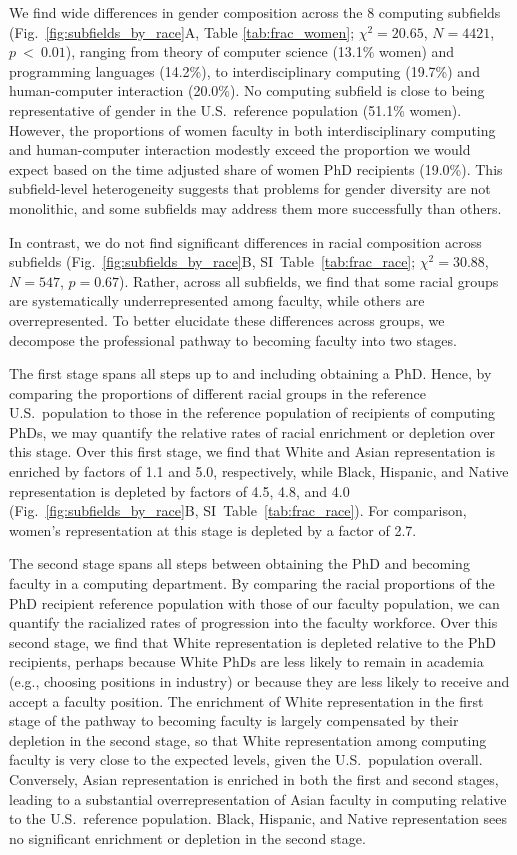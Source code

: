 \documentclass[reprint, twocolumn, aps, nofootinbib, superscriptaddress, longbibliography]{revtex4-1}
\begin{document}
We find wide differences in gender composition across the 8 computing subfields (Fig.~\ref{fig:subfields_by_race}A, Table \ref{tab:frac_women}; $\chi^{2} = 20.65$, $N = 4421$, $p~<~0.01$), ranging from theory of computer science (13.1\% women) and programming languages (14.2\%), to interdisciplinary computing (19.7\%) and human-computer interaction (20.0\%). No computing subfield is close to being representative of gender in the U.S.~reference population (51.1\% women). However, the proportions of women faculty in both interdisciplinary computing and human-computer interaction modestly exceed the proportion we would expect based on the time adjusted share of women PhD recipients (19.0\%). This subfield-level heterogeneity suggests that problems for gender diversity are not monolithic, and some subfields may address them more successfully than others. 

In contrast, we do not find significant differences in racial composition across subfields (Fig.~\ref{fig:subfields_by_race}B, SI~Table~\ref{tab:frac_race}; $\chi^2 = 30.88$, $N = 547$, $p = 0.67$). Rather, across all subfields, we find that some racial groups are systematically underrepresented among faculty, while others are overrepresented. To better elucidate these differences across groups, we decompose the professional pathway to becoming faculty into two stages. 

The first stage spans all steps up to and including obtaining a PhD. Hence, by comparing the proportions of different racial groups in the reference U.S.~population to those in the reference population of recipients of computing PhDs, we may quantify the relative rates of racial enrichment or depletion over this stage. Over this first stage, we find that White and Asian representation is enriched by factors of 1.1 and 5.0, respectively, while Black, Hispanic, and Native representation is depleted by factors of 4.5, 4.8, and 4.0 (Fig.~\ref{fig:subfields_by_race}B, SI~Table~\ref{tab:frac_race}). For comparison, women's representation at this stage is depleted by a factor of 2.7. 

The second stage spans all steps between obtaining the PhD and becoming faculty in a computing department. By comparing the racial proportions of the PhD recipient reference population with those of our faculty population, we can quantify the racialized rates of progression into the faculty workforce. Over this second stage, we find that White representation is depleted relative to the PhD recipients, perhaps because White PhDs are less likely to remain in academia (e.g., choosing positions in industry) or because they are less likely to receive and accept a faculty position. The enrichment of White representation in the first stage of the pathway to becoming faculty is largely compensated by their depletion in the second stage, so that White representation among computing faculty is very close to the expected levels, given the U.S.~population overall. Conversely, Asian representation is enriched in both the first and second stages, leading to a substantial overrepresentation of Asian faculty in computing relative to the U.S.~reference population. Black, Hispanic, and Native representation sees no significant enrichment or depletion in the second stage. 
\end{document}
